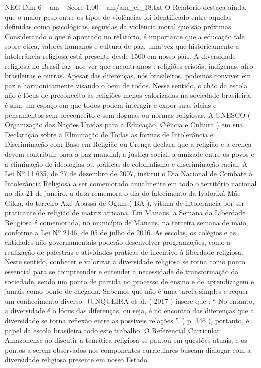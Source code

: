\begin{textsample}{NEG Dim 6 – am – Score 1.00 – am/am\_ef\_18.txt}
O Relatório destaca ainda, que o maior peso entre os tipos de violências foi identificado entre aquelas definidas como psicológicas, seguidas da violência moral que são próximas.
Considerando o que é apontado no relatório, é importante que a educação fale sobre ética, valores humanos e cultura de paz, uma vez que historicamente a intolerância religiosa está presente desde 1500 em nosso país.
A diversidade religiosa no Brasil faz -nos ver que encontramos : religiões cristãs, indígenas, afro-brasileiras e outras.
Apesar das diferenças, nós brasileiros, podemos conviver em paz e harmonicamente visando o bem de todos.
Nesse sentido, o chão da escola não é lócus de preconceito às religiões menos valorizadas na sociedade brasileira, é sim, um espaço em que todos podem interagir e expor suas ideias e pensamentos sem preconceito e sem dogmas ou normas religiosas.
A UNESCO ( Organização das Nações Unidas para a Educação, Ciência e Cultura ) em sua Declaração sobre a Eliminação de Todas as formas de Intolerância e Discriminação com Base em Religião ou Crença declara que a religião e a crença devem contribuir para a paz mundial, a justiça social, a amizade entre os povos e a eliminação de ideologias ou práticas de colonialismo e discriminação racial.
A Lei Nº 11.635, de 27 de dezembro de 2007, institui o Dia Nacional de Combate à Intolerância Religiosa a ser comemorado anualmente em todo o território nacional no dia 21 de janeiro, a data rememora o dia do falecimento da Iyalorixá Mãe Gilda, do terreiro Axé Abassá de Ogum ( BA ), vítima de intolerância por ser praticante de religião de matriz africana.
Em Manaus, a Semana da Liberdade Religiosa é comemorada, no município de Manaus, na terceira semana de maio, conforme a Lei Nº 2146, de 05 de julho de 2016.
As escolas, os colégios e as entidades não governamentais poderão desenvolver programações, como a realização de palestras e atividades práticas de incentivo à liberdade religiosa.
Neste sentido, conhecer e valorizar a diversidade religiosa se torna como ponto essencial para se compreender e entender a necessidade de transformação da sociedade, sendo um ponto de partida no processo de ensino e de aprendizagem e jamais como ponto de chegada.
Sabemos que não é uma tarefa simples e requer um conhecimento diverso.
JUNQUEIRA et al. ( 2017 ) insere que : “ No entanto, a diversidade é o lócus das diferenças, ou seja, é no encontro das diferenças que a diversidade se torna reflexão entre as possíveis relações ”. ( p. 346 ), portanto, é papel da escola brasileira todo este trabalho.
O Referencial Curricular Amazonense ao discutir a temática religiosa se pautou em questões atuais, e os pontos a serem observados nos componentes curriculares buscam dialogar com a diversidade religiosa presente em nosso Estado.

\end{textsample}
